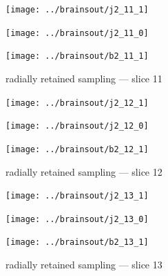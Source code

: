 \documentclass{article}
\begin{document}
\begin{figure}
\begin{centering}

\parbox{\imsize}{\texttt{[image: ../brainsout/j2\_11\_1]}}

\vspace{\vertsep}

\parbox{\imsize}{\texttt{[image: ../brainsout/j2\_11\_0]}}

\vspace{\vertsep}

\parbox{\imsize}{\texttt{[image: ../brainsout/b2\_11\_1]}}

\end{centering}
\caption{radially retained sampling --- slice 11}
\end{figure}


\begin{figure}
\begin{centering}

\parbox{\imsize}{\texttt{[image: ../brainsout/j2\_12\_1]}}

\vspace{\vertsep}

\parbox{\imsize}{\texttt{[image: ../brainsout/j2\_12\_0]}}

\vspace{\vertsep}

\parbox{\imsize}{\texttt{[image: ../brainsout/b2\_12\_1]}}

\end{centering}
\caption{radially retained sampling --- slice 12}
\end{figure}


\begin{figure}
\begin{centering}

\parbox{\imsize}{\texttt{[image: ../brainsout/j2\_13\_1]}}

\vspace{\vertsep}

\parbox{\imsize}{\texttt{[image: ../brainsout/j2\_13\_0]}}

\vspace{\vertsep}

\parbox{\imsize}{\texttt{[image: ../brainsout/b2\_13\_1]}}

\end{centering}
\caption{radially retained sampling --- slice 13}
\end{figure}
\end{document}
